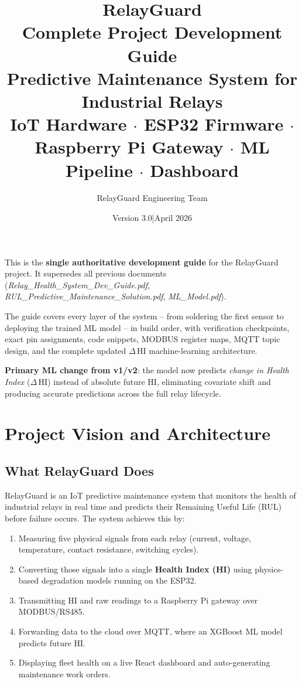 \documentclass[12pt,a4paper]{article}
\title{%
  {\LARGE\bfseries\color{accent}RelayGuard}\\[5pt]
  {\large Complete Project Development Guide}\\[7pt]
  {\normalsize\color{gray}
    Predictive Maintenance System for Industrial Relays\\[2pt]
    IoT Hardware \(\cdot\) ESP32 Firmware \(\cdot\) Raspberry Pi Gateway \(\cdot\) ML Pipeline \(\cdot\) Dashboard}
}
\author{RelayGuard Engineering Team}
\date{Version 3.0\quad|\quad April 2026}
\begin{document}
\maketitle
\thispagestyle{empty}

\vspace{0.5em}
\begin{tcolorbox}[colback=notebg,colframe=accent,title={\bfseries About This Document}]
This is the \textbf{single authoritative development guide} for the RelayGuard project. It supersedes all
previous documents (\textit{Relay\_Health\_System\_Dev\_Guide.pdf},
\textit{RUL\_Predictive\_Maintenance\_Solution.pdf}, \textit{ML\_Model.pdf}).

The guide covers every layer of the system -- from soldering the first sensor to deploying the trained ML
model -- in build order, with verification checkpoints, exact pin assignments, code snippets, MODBUS register
maps, MQTT topic design, and the complete updated $\Delta$\,HI machine-learning architecture.

\textbf{Primary ML change from v1/v2}: the model now predicts \textit{change in Health Index}
($\Delta$\,HI) instead of absolute future HI, eliminating covariate shift and producing accurate predictions
across the full relay lifecycle.
\end{tcolorbox}

\vspace{0.5em}
\tableofcontents
\clearpage

\section{Project Vision and Architecture}

\subsection{What RelayGuard Does}

RelayGuard is an IoT predictive maintenance system that monitors the health of industrial relays in real time
and predicts their Remaining Useful Life (RUL) before failure occurs. The system achieves this by:

\begin{enumerate}[noitemsep]
  \item Measuring five physical signals from each relay (current, voltage, temperature, contact resistance, switching cycles).
  \item Converting those signals into a single \textbf{Health Index (HI)} using physics-based degradation models running on the ESP32.
  \item Transmitting HI and raw readings to a Raspberry Pi gateway over MODBUS/RS485.
  \item Forwarding data to the cloud over MQTT, where an XGBoost ML model predicts future HI.
  \item Displaying fleet health on a live React dashboard and auto-generating maintenance work orders.
\end{enumerate}
\end{document}
